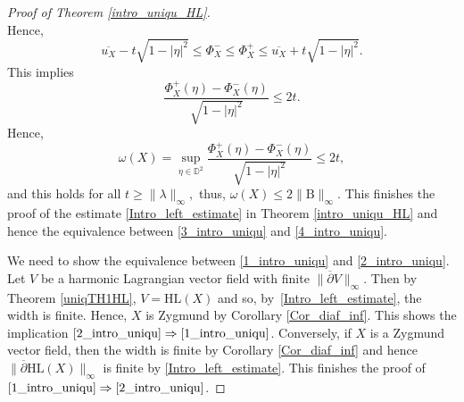 \documentclass[10pt]{amsart}
\theoremstyle{plain}
\theoremstyle{definition}
\newcommand{\B}{\mathrm{B}}
\begin{document}
\begin{proof}[Proof of Theorem \ref{intro_uniqu_HL}]
\[\]
Hence,
\[
\overline{u_X} - t \sqrt{1 - \lvert \eta \rvert^2} \leq \Phi_X^- \leq \Phi_X^+ \leq \overline{u_X} + t \sqrt{1 - \lvert \eta \rvert^2}.
\]
This implies
\[
\frac{\Phi_X^+(\eta) - \Phi_X^-(\eta)}{\sqrt{1 - \lvert \eta \rvert^2}} \leq 2t.
\]
Hence,
\[
\omega(X) = \sup_{\eta \in \mathbb{D}^2} \frac{\Phi_X^+(\eta) - \Phi_X^-(\eta)}{\sqrt{1 - \lvert \eta \rvert^2}} \leq 2t,
\]
and this holds for all \(t \geq \lVert \lambda \rVert_{\infty}, \) thus, \(\omega(X) \leq 2 \lVert \B\rVert_{\infty}. \) This finishes the proof of the estimate \eqref{Intro_left_estimate} in Theorem \ref{intro_uniqu_HL} and hence the equivalence between \eqref{3_intro_uniqu} and \eqref{4_intro_uniqu}.

We need to show the equivalence between \eqref{1_intro_uniqu} and \eqref{2_intro_uniqu}. Let \(V\) be a harmonic Lagrangian vector field with finite \(\lVert \overline{\partial} V \rVert_{\infty}\). Then by Theorem \ref{uniqTH1HL}, \(V = \mathrm{HL}(X)\) and so, by~\eqref{Intro_left_estimate}, the width is finite. Hence, \(X\) is Zygmund by Corollary \ref{Cor_diaf_inf}. This shows the implication $\eqref{2_intro_uniqu} \Rightarrow \eqref{1_intro_uniqu}$. Conversely, if \(X\) is a Zygmund vector field, then the width is finite by Corollary \ref{Cor_diaf_inf} and hence \(\lVert \overline{\partial} \mathrm{HL}(X) \rVert_{\infty}\) is finite by \eqref{Intro_left_estimate}. This finishes the proof of $\eqref{1_intro_uniqu} \Rightarrow\eqref{2_intro_uniqu}$.
\end{proof}
\end{document}
